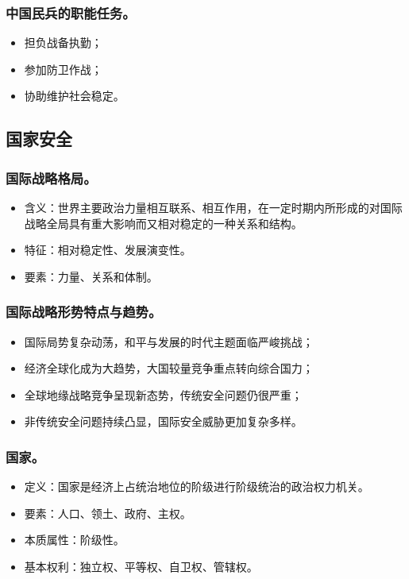 \documentclass{article}
\begin{document}
\subsubsection{中国民兵的职能任务。}
\begin{itemize}
    \item 担负战备执勤；
    \item 参加防卫作战；
    \item 协助维护社会稳定。
\end{itemize}

\subsection{国家安全}

\subsubsection{国际战略格局。}
\begin{itemize}
    \item 含义：世界主要政治力量相互联系、相互作用，在一定时期内所形成的对国际战略全局具有重大影响而又相对稳定的一种关系和结构。
    \item 特征：相对稳定性、发展演变性。
    \item 要素：力量、关系和体制。
\end{itemize}

\subsubsection{国际战略形势特点与趋势。}
\begin{itemize}
    \item 国际局势复杂动荡，和平与发展的时代主题面临严峻挑战；
    \item 经济全球化成为大趋势，大国较量竞争重点转向综合国力；
    \item 全球地缘战略竞争呈现新态势，传统安全问题仍很严重；
    \item 非传统安全问题持续凸显，国际安全威胁更加复杂多样。
\end{itemize}

\subsubsection{国家。}
\begin{itemize}
    \item 定义：国家是经济上占统治地位的阶级进行阶级统治的政治权力机关。
    \item 要素：人口、领土、政府、主权。
    \item 本质属性：阶级性。
    \item 基本权利：独立权、平等权、自卫权、管辖权。
\end{itemize}
\end{document}
